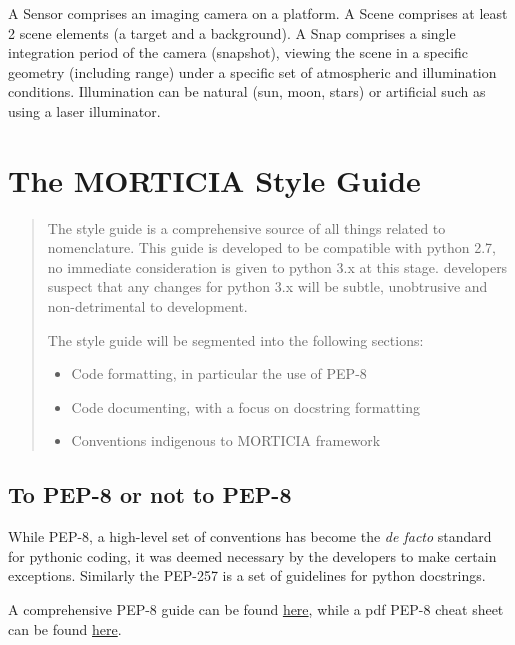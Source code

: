 \documentclass[a4paper,10pt,english]{sphinxmanual}
\begin{document}
A Sensor comprises an imaging camera on a platform. A Scene comprises at least 2 scene elements (a target and a
background). A Snap comprises a single integration period of the camera (snapshot), viewing the scene in a specific geometry
(including range) under a specific set of atmospheric and illumination conditions. Illumination can be natural
(sun, moon, stars) or artificial such as using a laser illuminator.


\chapter{The MORTICIA Style Guide}
\label{styleguide:the-morticia-style-guide}\label{styleguide::doc}\begin{quote}

The  style guide is a comprehensive source of all things related to  nomenclature. This guide is developed to be compatible with python 2.7, no
immediate consideration is given to python 3.x at this stage.  developers suspect that any changes for python 3.x will be subtle, unobtrusive and non-detrimental
to  development.

The style guide will be segmented into the following sections:
\begin{itemize}
\item {} 
Code formatting, in particular the use of PEP-8

\item {} 
Code documenting, with a focus on docstring formatting

\item {} 
Conventions indigenous to MORTICIA framework

\end{itemize}
\end{quote}


\section{To PEP-8 or not to PEP-8}
\label{styleguide:pep8}\label{styleguide:to-pep-8-or-not-to-pep-8}
While PEP-8, a high-level set of conventions has become the \emph{de facto} standard for pythonic coding, it was deemed necessary by the  developers
to make certain exceptions. Similarly the PEP-257 is a set of guidelines for python docstrings.

A comprehensive PEP-8 guide can be found \href{http://legacy.python.org/dev/peps/pep-0008/\#a-foolish-consistency-is-the-hobgoblin-of-little-minds}{here}, while a pdf
PEP-8 cheat sheet can be found \href{https://www.google.co.za/url?sa=t\&rct=j\&q=\&esrc=s\&source=web\&cd=1\&cad=rja\&uact=8\&ved=0ahUKEwjZr-egubPKAhVH1RQKHaZKDF8QFggaMAA\&url=https\%3A\%2F\%2Fwww.pkimber.net\%2Fopen\%2F\_downloads\%2Fpep8\_cheat.pdf\&usg=AFQjCNGGoQ7DSCwaprDjuc356SwegyEkWA\&sig2=Z-aVuunhXiWS-byXk3TGCQ}{here}.
\end{document}
